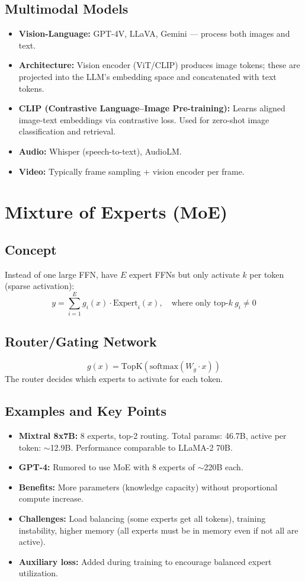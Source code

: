 \documentclass[11pt,a4paper]{article}
\begin{document}
\subsection{Multimodal Models}
\begin{itemize}[nosep]
  \item \textbf{Vision-Language:} GPT-4V, LLaVA, Gemini --- process both images and text.
  \item \textbf{Architecture:} Vision encoder (ViT/CLIP) produces image tokens; these are projected into the LLM's embedding space and concatenated with text tokens.
  \item \textbf{CLIP (Contrastive Language--Image Pre-training):} Learns aligned image-text embeddings via contrastive loss. Used for zero-shot image classification and retrieval.
  \item \textbf{Audio:} Whisper (speech-to-text), AudioLM.
  \item \textbf{Video:} Typically frame sampling + vision encoder per frame.
\end{itemize}

\section{Mixture of Experts (MoE)}

\subsection{Concept}
Instead of one large FFN, have $E$ expert FFNs but only activate $k$ per token (sparse activation):
\[
  y = \sum_{i=1}^{E} g_i(x) \cdot \text{Expert}_i(x), \quad \text{where only top-}k\ g_i \neq 0
\]

\subsection{Router/Gating Network}
\[
  g(x) = \text{TopK}\!\left(\text{softmax}(W_g \cdot x)\right)
\]
The router decides which experts to activate for each token.

\subsection{Examples and Key Points}
\begin{itemize}[nosep]
  \item \textbf{Mixtral 8x7B:} 8 experts, top-2 routing. Total params: 46.7B, active per token: $\sim$12.9B. Performance comparable to LLaMA-2 70B.
  \item \textbf{GPT-4:} Rumored to use MoE with 8 experts of $\sim$220B each.
  \item \textbf{Benefits:} More parameters (knowledge capacity) without proportional compute increase.
  \item \textbf{Challenges:} Load balancing (some experts get all tokens), training instability, higher memory (all experts must be in memory even if not all are active).
  \item \textbf{Auxiliary loss:} Added during training to encourage balanced expert utilization.
\end{itemize}
\end{document}
